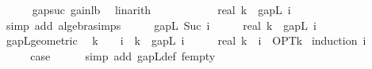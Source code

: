\begin{isabellebody}
\ \ \ \ \isamarkupfalse%
\ gap{\isacharunderscore}{\kern0pt}suc\ gain{\isacharunderscore}{\kern0pt}lb\ \isamarkupfalse%
\ linarith\isanewline
\ \ \isamarkupfalse%
\ \isamarkupfalse%
\ {\isachardoublequoteopen}{\isachardot}{\kern0pt}{\isachardot}{\kern0pt}{\isachardot}{\kern0pt}\ {\isacharequal}{\kern0pt}\ {\isacharparenleft}{\kern0pt}{}\ {\isacharminus}{\kern0pt}\ {}\ {\isacharslash}{\kern0pt}\ real\ k{\isacharparenright}{\kern0pt}\ {\isacharasterisk}{\kern0pt}\ gapL\ i{\isachardoublequoteclose}\isanewline
\ \ \ \ \isamarkupfalse%
\ {\isacharparenleft}{\kern0pt}simp\ add{\isacharcolon}{\kern0pt}\ algebra{\isacharunderscore}{\kern0pt}simps{\isacharparenright}{\kern0pt}\isanewline
\ \ \isamarkupfalse%
\ \isamarkupfalse%
\ {\isachardoublequoteopen}gapL\ {\isacharparenleft}{\kern0pt}Suc\ i{\isacharparenright}{\kern0pt}\ {\isasymle}\ {\isacharparenleft}{\kern0pt}{}\ {\isacharminus}{\kern0pt}\ {}\ {\isacharslash}{\kern0pt}\ real\ k{\isacharparenright}{\kern0pt}\ {\isacharasterisk}{\kern0pt}\ gapL\ i{\isachardoublequoteclose}\ \isakeywordONE{{\isachardot}{\kern0pt}}\isamarkupfalse%
\isanewline
{}\isamarkupfalse%
%
\endisatagproof
{\isafoldproof}%
%
\isadelimproof
\isanewline
%
\endisadelimproof
\isanewline
{}\isamarkupfalse%
\ gapL{\isacharunderscore}{\kern0pt}geometric{\isacharcolon}{\kern0pt}\isanewline
\ \ {\isachardoublequoteopen}k\ {\isachargreater}{\kern0pt}\ {}\ {\isasymLongrightarrow}\ i\ {\isasymle}\ k\ {\isasymLongrightarrow}\ gapL\ i\ {\isasymle}\ {\isacharparenleft}{\kern0pt}{}\ {\isacharminus}{\kern0pt}\ {}\ {\isacharslash}{\kern0pt}\ real\ k{\isacharparenright}{\kern0pt}\ {\isacharcircum}{\kern0pt}\ i\ {\isacharasterisk}{\kern0pt}\ OPT{\isacharunderscore}{\kern0pt}k{\isachardoublequoteclose}\isanewline
%
\isadelimproof
%
\endisadelimproof
%
\isatagproof
{}\isamarkupfalse%
\ {\isacharparenleft}{\kern0pt}induction\ i{\isacharparenright}{\kern0pt}\isanewline
\ \ \isamarkupfalse%
\ {}\isanewline
\ \ \isamarkupfalse%
\ \isamarkupfalse%
\ {\isacharquery}{\kern0pt}case\isanewline
\ \ \ \ \isamarkupfalse%
\ {\isacharparenleft}{\kern0pt}simp\ add{\isacharcolon}{\kern0pt}\ gapL{\isacharunderscore}{\kern0pt}def\ f{\isacharunderscore}{\kern0pt}empty{\isacharparenright}{\kern0pt}\isanewline
{}\isamarkupfalse%

\end{isabellebody}
